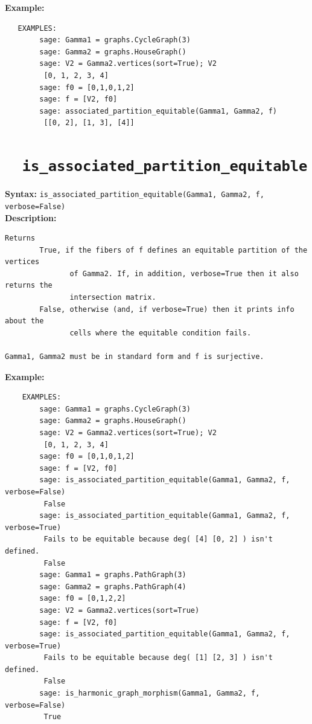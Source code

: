 \documentclass{article}
\begin{document}
\textbf{Example:}
\begin{verbatim}
   EXAMPLES:
        sage: Gamma1 = graphs.CycleGraph(3) 
        sage: Gamma2 = graphs.HouseGraph()   
        sage: V2 = Gamma2.vertices(sort=True); V2  
         [0, 1, 2, 3, 4]
        sage: f0 = [0,1,0,1,2]     
        sage: f = [V2, f0]         
        sage: associated_partition_equitable(Gamma1, Gamma2, f) 
         [[0, 2], [1, 3], [4]]
\end{verbatim}

\section{\tt \ \ is\_associated\_partition\_equitable}

\textbf{Syntax:} \verb}is_associated_partition_equitable(Gamma1, Gamma2, f, verbose=False)}\\

\textbf{Description:}
\begin{verbatim}
Returns 
        True, if the fibers of f defines an equitable partition of the vertices
               of Gamma2. If, in addition, verbose=True then it also returns the
               intersection matrix. 
        False, otherwise (and, if verbose=True) then it prints info about the 
               cells where the equitable condition fails.

Gamma1, Gamma2 must be in standard form and f is surjective.
\end{verbatim}

\textbf{Example:}
\begin{verbatim}
    EXAMPLES:
        sage: Gamma1 = graphs.CycleGraph(3) 
        sage: Gamma2 = graphs.HouseGraph()      
        sage: V2 = Gamma2.vertices(sort=True); V2 
         [0, 1, 2, 3, 4]
        sage: f0 = [0,1,0,1,2]      
        sage: f = [V2, f0]          
        sage: is_associated_partition_equitable(Gamma1, Gamma2, f, verbose=False)   
         False
        sage: is_associated_partition_equitable(Gamma1, Gamma2, f, verbose=True)   
         Fails to be equitable because deg( [4] [0, 2] ) isn't defined.
         False
        sage: Gamma1 = graphs.PathGraph(3) 
        sage: Gamma2 = graphs.PathGraph(4) 
        sage: f0 = [0,1,2,2] 
        sage: V2 = Gamma2.vertices(sort=True) 
        sage: f = [V2, f0]                                                                                                    
        sage: is_associated_partition_equitable(Gamma1, Gamma2, f, verbose=True) 
         Fails to be equitable because deg( [1] [2, 3] ) isn't defined.
         False
        sage: is_harmonic_graph_morphism(Gamma1, Gamma2, f, verbose=False) 
         True
\end{verbatim}
\end{document}
